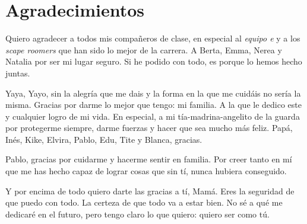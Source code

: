 
\chapter*{Agradecimientos}

Quiero agradecer a todos mis compañeros de clase, en especial al \textit{equipo e} y a los \textit{scape roomers} que han sido lo mejor de la carrera. A Berta, Emma, Nerea y Natalia por ser mi lugar seguro. Si he podido con todo, es porque lo hemos hecho juntas.

Yaya, Yayo, sin la alegría que me dais y la forma en la que me cuidáis no sería la misma. Gracias por darme lo mejor que tengo: mi familia. A la que le dedico este y cualquier logro de mi vida. En especial, a mi tía-madrina-angelito de la guarda por protegerme siempre, darme fuerzas y hacer que sea mucho más feliz. Papá, Inés, Kike, Elvira, Pablo, Edu, Tite y Blanca, gracias.

Pablo, gracias por cuidarme y hacerme sentir en familia. Por creer tanto en mí que me has hecho capaz de lograr cosas que sin tí, nunca hubiera conseguido.

Y por encima de todo quiero darte las gracias a tí, Mamá. Eres la seguridad de que puedo con todo. La certeza de que todo va a estar bien. No sé a qué me dedicaré en el futuro, pero tengo claro lo que quiero: quiero ser como tú. 
















